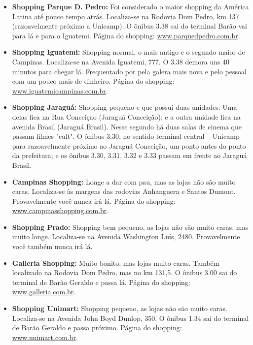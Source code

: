 \begin{itemize}

\item  \textbf{Shopping Parque D. Pedro:} Foi considerado o maior shopping da
    América Latina até pouco tempo atrás. Localiza-se na Rodovia Dom Pedro, km
    137 (razoavelmente próximo a Unicamp). O ônibus 3.38 sai do terminal Barão
    vai para lá e para o Iguatemi. Página do shopping:
    \url{www.parquedpedro.com.br}.

\item  \textbf{Shopping Iguatemi:} Shopping normal, o mais antigo e o segundo
    maior de Campinas. Localiza-se na Avenida Iguatemi, 777. O 3.38 demora uns
    40 minutos para chegar lá. Frequentado por pela galera mais nova e pelo
    pessoal com um pouco mais de dinheiro. Página do shopping:
    \url{www.iguatemicampinas.com.br}.

\item  \textbf{Shopping Jaraguá:} Shopping pequeno e que possui duas unidades:
    Uma delas fica na Rua Conceiçao (Jaraguá Conceição); e a outra unidade fica
    na avenida Brasil (Jaraguá Brasil). Nesse segundo há duas salas de cinema
    que passam filmes "cult". O ônibus 3.30, no sentido terminal central --
    Unicamp para razoavelmente próximo ao Jaraguá Conceição, um ponto antes do
    ponto da prefeitura; e os ônibus 3.30, 3.31, 3.32 e 3.33 passam em frente ao
    Jaraguá Brasil.

\item  \textbf{Campinas Shopping:} Longe a dar com pau, mas as lojas não são
    muito caras. Localiza-se às margens das rodovias Anhanguera e Santos Dumont.
    Provavelmente você nunca irá lá. Página do shopping:
    \url{www.campinasshopping.com.br}.

\item  \textbf{Shopping Prado:} Shopping bem pequeno, as lojas não são muito
    caras, mas muito longe. Localiza-se na Avenida Washington Luís, 2480.
    Provavelmente você também nunca irá lá.

\item  \textbf{Galleria Shopping:} Muito bonito, mas lojas muito caras. Também
    localizado na Rodovia Dom Pedro, mas no km 131,5. O ônibus 3.00 sai do
    terminal de Barão Geraldo e passa lá. Página do shopping:
    \url{www.galleria.com.br}.

\item  \textbf{Shopping Unimart:} Shopping pequeno, as lojas não são muito
    caras. Localiza-se na Avenida John Boyd Dunlop, 350. O ônibus 1.34 sai do
    terminal de Barão Geraldo e passa próximo. Página do shopping:
    \url{www.unimart.com.br}.

\end{itemize}